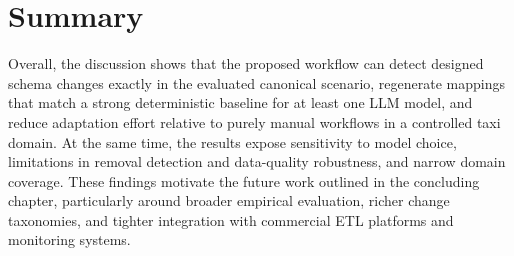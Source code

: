 \section{Summary}
\label{sec:discussion-summary}

Overall, the discussion shows that the proposed workflow can detect designed schema changes exactly in the evaluated canonical scenario, regenerate mappings that match a strong deterministic baseline for at least one LLM model, and reduce adaptation effort relative to purely manual workflows in a controlled taxi domain. At the same time, the results expose sensitivity to model choice, limitations in removal detection and data-quality robustness, and narrow domain coverage. These findings motivate the future work outlined in the concluding chapter, particularly around broader empirical evaluation, richer change taxonomies, and tighter integration with commercial ETL platforms and monitoring systems.

